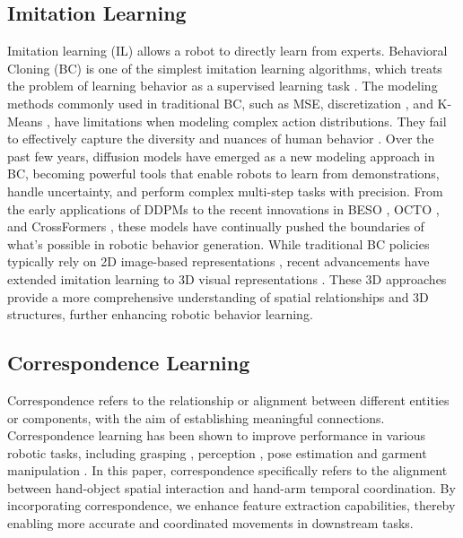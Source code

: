 \subsection{Imitation Learning}
Imitation learning (IL) allows a robot to directly learn from experts. Behavioral Cloning (BC) is one of the simplest imitation learning algorithms, which treats the problem of learning behavior as a supervised learning task \cite{pomerleau1988alvinn}.
The modeling methods commonly used in traditional BC, such as MSE, discretization \cite{lin2020limitations}, and K-Means \cite{guss2021towards}, have limitations when modeling complex action distributions. They fail to effectively capture the diversity and nuances of human behavior \cite{pearce2023imitating}. 
Over the past few years, diffusion models have emerged as a new modeling approach in BC, becoming powerful tools that enable robots to learn from demonstrations, handle uncertainty, and perform complex multi-step tasks with precision.
From the early applications of DDPMs to the recent innovations in BESO \cite{reuss2023goal}, OCTO \cite{team2024octo}, and CrossFormers \cite{doshi2024scaling}, these models have continually pushed the boundaries of what's possible in robotic behavior generation.
While traditional BC policies typically rely on 2D image-based representations \cite{chi2023diffusion, zhao2023learning, wang2023mimicplay, xia2024cage, liang2024dexhanddiffinteractionawarediffusionplanning}, recent advancements have extended imitation learning to 3D visual representations \cite{ze20243d, chen2024g3flow, gervet2023act3d, wang2024dexcap, wang2024rise, lu2024manicm}. 
These 3D approaches provide a more comprehensive understanding of spatial relationships and 3D structures, further enhancing robotic behavior learning.


\subsection{Correspondence Learning}
Correspondence refers to the relationship or alignment between different entities or components, with the aim of establishing meaningful connections. Correspondence learning has been shown to improve performance in various robotic tasks, including grasping \cite{patten2020dgcm, ding2024preafford}, perception \cite{lai2021functional, chen2024g3flow}, pose estimation \cite{haugaard2022surfemb} and garment manipulation \cite{Wu_2024_CVPR}. In this paper, correspondence specifically refers to the alignment between hand-object spatial interaction and hand-arm temporal coordination. By incorporating correspondence, we enhance feature extraction capabilities, thereby enabling more accurate and coordinated movements in downstream tasks.

%